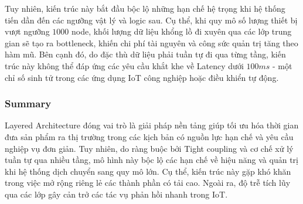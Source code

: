 Tuy nhiên, kiến trúc này bắt đầu bộc lộ những hạn chế hệ trọng khi hệ thống tiến dần đến các ngưỡng vật lý và logic sau. Cụ thể, khi quy mô số lượng thiết bị vượt ngưỡng $1000$ node, khối lượng dữ liệu khổng lồ đi xuyên qua các lớp trung gian sẽ tạo ra bottleneck, khiến chi phí tài nguyên và công sức quản trị tăng theo hàm mũ. Bên cạnh đó, do đặc thù dữ liệu phải tuần tự đi qua từng tầng, kiến trúc này không thể đáp ứng các yêu cầu khắt khe về Latency dưới $100ms$ - một chỉ số sinh tử trong các ứng dụng IoT công nghiệp hoặc điều khiển tự động.

\subsubsection{Summary}
Layered Architecture đóng vai trò là giải pháp nền tảng giúp tối ưu hóa thời gian đưa sản phẩm ra thị trường trong các kịch bản có nguồn lực hạn chế và yêu cầu nghiệp vụ đơn giản. Tuy nhiên, do ràng buộc bởi Tight coupling và cơ chế xử lý tuần tự qua nhiều tầng, mô hình này bộc lộ các hạn chế về hiệu năng và quản trị khi hệ thống dịch chuyển sang quy mô lớn. Cụ thể, kiến trúc này gặp khó khăn trong việc mở rộng riêng lẻ các thành phần có tải cao. Ngoài ra, độ trễ tích lũy qua các lớp gây cản trở các tác vụ phản hồi nhanh trong IoT.